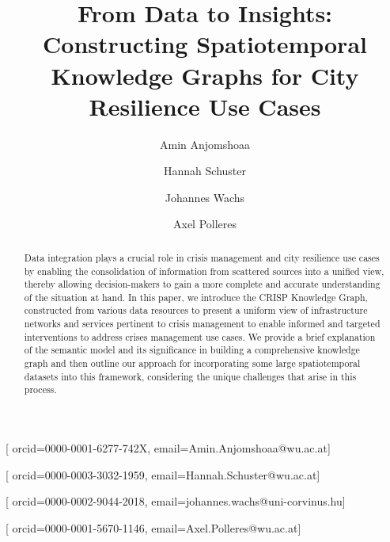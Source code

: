 \documentclass[
]{ceurart}
\begin{document}


\title{From Data to Insights: Constructing Spatiotemporal Knowledge Graphs for City Resilience Use Cases}


\author[1,2]{Amin Anjomshoaa}[%
orcid=0000-0001-6277-742X,
email=Amin.Anjomshoaa@wu.ac.at]

\address[1]{Vienna University of Economics and Business, Welthandelsplatz 1, 1020 Vienna, Austria}
\address[2]{Complexity Science Hub Vienna, Josefstaedter Strasse 39, 1080 Vienna, Austria}
\address[3]{Corvinus University of Budapest, F\H{o}vám tér 8, 1093 Budapest, Hungary}
\address[4]{Centre for Economic and Regional Studies, Tóth Kálmán u. 4, 1097 Budapest, Hungary}

\author[1,2]{Hannah Schuster}[%
orcid=0000-0003-3032-1959,
email=Hannah.Schuster@wu.ac.at]

\author[3,4]{Johannes Wachs}[%
orcid=0000-0002-9044-2018,
email=johannes.wachs@uni-corvinus.hu]

\author[1,2]{Axel Polleres}[%
orcid=0000-0001-5670-1146,
email=Axel.Polleres@wu.ac.at]

\begin{abstract}
Data integration plays a crucial role in crisis management and city resilience use cases by enabling the consolidation of information from scattered sources into a unified view, thereby allowing decision-makers to gain a more complete and accurate understanding of the situation at hand. In this paper, we introduce the CRISP Knowledge Graph, constructed from various data resources to present a uniform view of infrastructure networks and services pertinent to crisis management to enable informed and targeted interventions to address crises management use cases. We  provide a brief explanation of the semantic model and its significance in building a comprehensive knowledge graph and then outline our approach for incorporating some large spatiotemporal datasets into this framework, considering the unique challenges that arise in this process.

\end{abstract}
\end{document}
